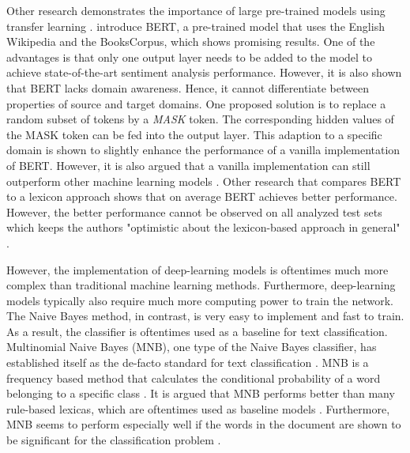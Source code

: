 \documentclass[11pt, a4paper]{article}
\begin{document}
Other research demonstrates the importance of large pre-trained models using transfer learning \citep{deng2009transferlearning}.
\cite{devlin2019bert} introduce BERT, a pre-trained model that uses the English Wikipedia and the BooksCorpus, which shows promising results.
One of the advantages is that only one output layer needs to be added to the model to achieve state-of-the-art sentiment analysis performance.
However, it is also shown that BERT lacks domain awareness. Hence, it cannot differentiate between properties of source and target domains. One
proposed solution is to replace a random subset of tokens by a \emph{MASK} token. The corresponding hidden values of the MASK token can be fed
into the output layer. This adaption to a specific domain is shown to slightly enhance the performance of a vanilla implementation of BERT. However,
it is also argued that a vanilla implementation can still outperform other machine learning models \citep{Du2020AdversarialAD}. Other research that compares BERT to a
lexicon approach shows that on average BERT achieves better performance. However, the better performance cannot be observed on all analyzed test sets
which keeps the authors "optimistic about the lexicon-based approach in general" \citep{kotelnikova2021lexiconbased}. %

However, the implementation of deep-learning models is oftentimes much more complex than traditional machine learning methods. Furthermore, deep-learning models typically
also require much more computing power to train the network. The Naive Bayes method, in contrast, is very easy to implement and fast to train. As a
result, the classifier is oftentimes used as a baseline for text classification. Multinomial Naive Bayes (MNB), one type of the Naive Bayes classifier, has established
itself as the de-facto standard for text classification \citep{abbas2019mnb}. MNB is a frequency based method that calculates the conditional probability of a word
belonging to a specific class \citep{susanti2017sentiment}. %
It is argued that MNB performs better than many rule-based lexicas, which are oftentimes
used as baseline models \citep{wang2012NB}. Furthermore, MNB seems to perform especially well if the words in the document are shown to be significant for the
classification problem \citep{omar2019conference}.
\end{document}
